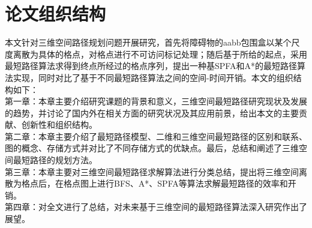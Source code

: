 \section{论文组织结构}
本文针对三维空间路径规划问题开展研究，首先将障碍物的aabb包围盒以某个尺度离散为具体的格点，对格点进行不可访问标记处理；随后基于所给的起点，采用最短路径算法求得到终点所经过的格点序列，提出一种基SPFA和A*的最短路径算法实现，同时对比了基于不同最短路径算法之间的空间-时间开销。本文的组织结构如下：\\第一章：本章主要介绍研究课题的背景和意义，三维空间最短路径研究现状及发展的趋势，并讨论了国内外在相关方面的研究状况及其应用前景，给出本文的主要贡献、创新性和组织结构。\\第二章：本章主要介绍了最短路径模型、二维和三维空间最短路径的区别和联系、图的概念、存储方式并对比了不同存储方式的优缺点。最后，总结和阐述了三维空间最短路径的规划方法。\\第三章：本章主要对三维空间最短路径求解算法进行分类总结，提出将三维空间离散为格点后，在格点图上进行BFS、A*、SPFA等算法求解最短路径的效率和开销。\\第四章：对全文进行了总结，对未来基于三维空间的最短路径算法深入研究作出了展望。